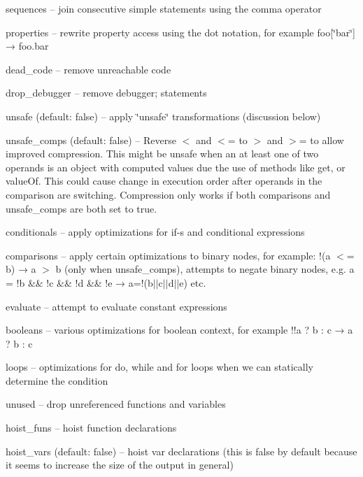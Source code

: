 \begin{DoxyItemize}
\item {\ttfamily sequences} -- join consecutive simple statements using the comma operator
\item {\ttfamily properties} -- rewrite property access using the dot notation, for example {\ttfamily foo\mbox{[}\char`\"{}bar\char`\"{}\mbox{]} → foo.\+bar}
\item {\ttfamily dead\+\_\+code} -- remove unreachable code
\item {\ttfamily drop\+\_\+debugger} -- remove {\ttfamily debugger;} statements
\item {\ttfamily unsafe} (default\+: false) -- apply \char`\"{}unsafe\char`\"{} transformations (discussion below)
\item {\ttfamily unsafe\+\_\+comps} (default\+: false) -- Reverse {\ttfamily $<$} and {\ttfamily $<$=} to {\ttfamily $>$} and {\ttfamily $>$=} to allow improved compression. This might be unsafe when an at least one of two operands is an object with computed values due the use of methods like {\ttfamily get}, or {\ttfamily value\+Of}. This could cause change in execution order after operands in the comparison are switching. Compression only works if both {\ttfamily comparisons} and {\ttfamily unsafe\+\_\+comps} are both set to true.
\item {\ttfamily conditionals} -- apply optimizations for {\ttfamily if}-\/s and conditional expressions
\item {\ttfamily comparisons} -- apply certain optimizations to binary nodes, for example\+: {\ttfamily !(a $<$= b) → a $>$ b} (only when {\ttfamily unsafe\+\_\+comps}), attempts to negate binary nodes, e.\+g. {\ttfamily a = !b \&\& !c \&\& !d \&\& !e → a=!(b$\vert$$\vert$c$\vert$$\vert$d$\vert$$\vert$e)} etc.
\item {\ttfamily evaluate} -- attempt to evaluate constant expressions
\item {\ttfamily booleans} -- various optimizations for boolean context, for example {\ttfamily !!a ? b \+: c → a ? b \+: c}
\item {\ttfamily loops} -- optimizations for {\ttfamily do}, {\ttfamily while} and {\ttfamily for} loops when we can statically determine the condition
\item {\ttfamily unused} -- drop unreferenced functions and variables
\item {\ttfamily hoist\+\_\+funs} -- hoist function declarations
\item {\ttfamily hoist\+\_\+vars} (default\+: false) -- hoist {\ttfamily var} declarations (this is {\ttfamily false} by default because it seems to increase the size of the output in general)

\end{DoxyItemize}
